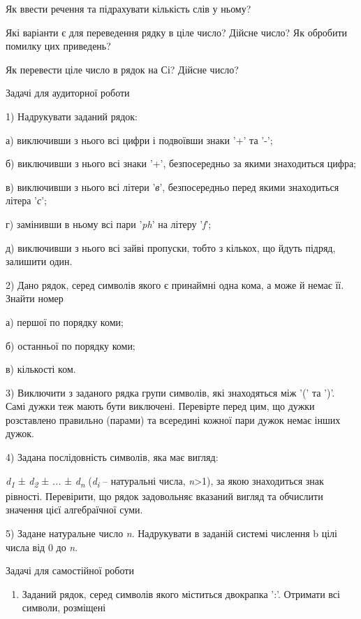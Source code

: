 \documentclass[]{article}
\begin{document}
Як ввести речення та підрахувати кількість слів у ньому?

Які варіанти є для переведення рядку в ціле число? Дійсне число? Як
обробити помилку цих приведень?

Як перевести ціле число в рядок на Сі? Дійсне число?

Задачі для аудиторної роботи

1) Надрукувати заданий рядок:

а) виключивши з нього всі цифри і подвоївши знаки '+' та '-';

б) виключивши з нього всі знаки '+', безпосередньо за якими знаходиться
цифра;

в) виключивши з нього всі літери '\emph{в}', безпосередньо перед якими
знаходиться літера '\emph{с}';

г) замінивши в ньому всі пари '\emph{ph}' на літеру '\emph{f}';

д) виключивши з нього всі зайві пропуски, тобто з кількох, що йдуть
підряд, залишити один.

2) Дано рядок, серед символів якого є принаймні одна кома, а може й
немає її. Знайти номер

а) першої по порядку коми;

б) останньої по порядку коми;

в) кількості ком.

3) Виключити з заданого рядка групи символів, які знаходяться між '(' та
')'. Самі дужки теж мають бути виключені. Перевірте перед цим, що дужки
розставлено правильно (парами) та всередині кожної пари дужок немає
інших дужок.

4) Задана послідовність символів, яка має вигляд:

\emph{d\textsubscript{1}} ± \emph{d\textsubscript{2}} ± \emph{...} ±
\emph{d\textsubscript{n }}(\emph{d\textsubscript{i }}-- натуральні
числа, \emph{n}\textgreater{}1), за якою знаходиться знак рівності.
Перевірити, що рядок задовольняє вказаний вигляд та обчислити значення
цієї алгебраїчної суми.

5) Задане натуральне число \emph{n}. Надрукувати в заданій системі
числення b цілі числа від 0 до \emph{n}.

Задачі для самостійної роботи

\begin{enumerate}
\def\labelenumi{\arabic{enumi})}
\setcounter{enumi}{5}
\item
  Заданий рядок, серед символів якого міститься двокрапка ':'. Отримати
  всі символи, розміщені
\end{enumerate}
\end{document}
